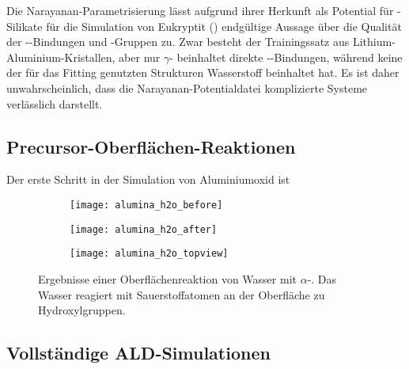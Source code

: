 Die Narayanan-Parametrisierung lässt aufgrund ihrer Herkunft als Potential für -Silikate für die Simulation von Eukryptit () endgültige Aussage über die Qualität der --Bindungen und -Gruppen zu.
Zwar besteht der Trainingssatz aus Lithium-Aluminium-Kristallen, aber nur $\gamma$- beinhaltet direkte --Bindungen, während keine der für das Fitting genutzten Strukturen Wasserstoff beinhaltet hat.
Es ist daher unwahrscheinlich, dass die Narayanan-Potentialdatei komplizierte Systeme verlässlich darstellt.

\subsection{Precursor-Oberflächen-Reaktionen}

Der erste Schritt in der Simulation von Aluminiumoxid ist 

\begin{figure}
  \captionsetup[subfigure]{singlelinecheck=false}
  \def\subfigwidth{0.32\textwidth}
  \begin{subfigure}[t]{\subfigwidth}
    \texttt{[image: alumina\_h2o\_before]}
  \end{subfigure}
  \hfill
  \begin{subfigure}[t]{\subfigwidth}
    \texttt{[image: alumina\_h2o\_after]}
  \end{subfigure}
  \hfill
  \begin{subfigure}[t]{\subfigwidth}
    \texttt{[image: alumina\_h2o\_topview]}
  \end{subfigure}
  \caption[Oberflächenreaktion von Wasser mit $\alpha$-]{Ergebnisse einer Oberflächenreaktion von Wasser mit $\alpha$-.
    Das Wasser reagiert mit Sauerstoffatomen an der Oberfläche zu Hydroxylgruppen.
  }
  \label{fig:wateraluminasurface}
\end{figure}

\subsection{Vollständige ALD-Simulationen}


